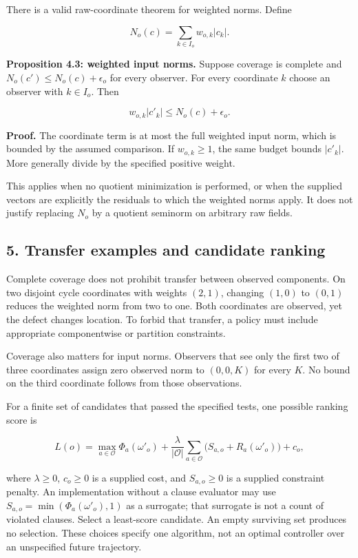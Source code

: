 \documentclass[
]{article}
\begin{document}
There is a valid raw-coordinate theorem for weighted norms. Define

\[
N_o(c)=\sum_{k\in I_o}w_{o,k}|c_k|.
\]

\textbf{Proposition 4.3: weighted input norms.} Suppose coverage is
complete and \(N_o(c')\le N_o(c)+\epsilon_o\) for every observer. For
every coordinate \(k\) choose an observer with \(k\in I_o\). Then

\[
w_{o,k}|c'_k|\le N_o(c)+\epsilon_o.
\]

\textbf{Proof.} The coordinate term is at most the full weighted input
norm, which is bounded by the assumed comparison. If \(w_{o,k}\ge1\),
the same budget bounds \(|c'_k|\). More generally divide by the
specified positive weight.

This applies when no quotient minimization is performed, or when the
supplied vectors are explicitly the residuals to which the weighted
norms apply. It does not justify replacing \(N_o\) by a quotient
seminorm on arbitrary raw fields.

\subsection{5. Transfer examples and candidate
ranking}\label{transfer-examples-and-candidate-ranking}

Complete coverage does not prohibit transfer between observed
components. On two disjoint cycle coordinates with weights \((2,1)\),
changing \((1,0)\) to \((0,1)\) reduces the weighted norm from two to
one. Both coordinates are observed, yet the defect changes location. To
forbid that transfer, a policy must include appropriate componentwise or
partition constraints.

Coverage also matters for input norms. Observers that see only the first
two of three coordinates assign zero observed norm to \((0,0,K)\) for
every \(K\). No bound on the third coordinate follows from those
observations.

For a finite set of candidates that passed the specified tests, one
possible ranking score is

\[
L(o)=\max_{a\in\mathcal O}\Phi_a(\omega'_o)+
\frac{\lambda}{|\mathcal O|}\sum_{a\in\mathcal O}
 \bigl(S_{a,o}+R_a(\omega'_o)\bigr)+c_o,
\]

where \(\lambda\ge0\), \(c_o\ge0\) is a supplied cost, and
\(S_{a,o}\ge0\) is a supplied constraint penalty. An implementation
without a clause evaluator may use \(S_{a,o}=\min(\Phi_a(\omega'_o),1)\)
as a surrogate; that surrogate is not a count of violated clauses.
Select a least-score candidate. An empty surviving set produces no
selection. These choices specify one algorithm, not an optimal
controller over an unspecified future trajectory.
\end{document}
